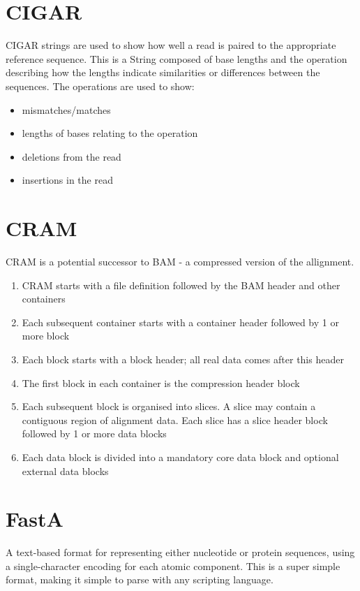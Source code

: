 \documentclass[12pt]{report}
\begin{document}
\section*{CIGAR}
CIGAR strings are used to show how well a read is paired to the appropriate reference sequence. This is a String composed of base lengths and the operation describing how the lengths indicate similarities or differences between the sequences. The operations are used to show:

\begin{itemize}
	\item mismatches/matches
	\item lengths of bases relating to the operation
	\item deletions from the read
	\item insertions in the read
\end{itemize}

\section*{CRAM}
CRAM is a potential successor to BAM - a compressed version of the allignment.
\begin{enumerate}
	\item CRAM starts with a file definition followed by the BAM header and other containers
	\item Each subsequent container starts with a container header followed by 1 or more block
	\item Each block starts with a block header; all real data comes after this header
	\item The first block in each container is the compression header block
	\item Each subsequent block is organised into slices. A slice may contain a contiguous region of alignment data. Each slice has a slice header block followed by 1 or more data blocks
	\item Each data block is divided into a mandatory core data block and optional external data blocks
\end{enumerate}

\section*{FastA}
A text-based format for representing either nucleotide or protein sequences, using a single-character encoding for each atomic component. This is a super simple format, making it simple to parse with any scripting language.
\end{document}
